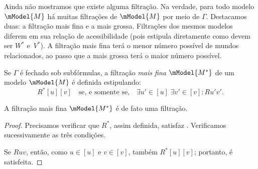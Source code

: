 \documentclass[../../../include/open-logic-section]{subfiles}
\begin{document}


Ainda não mostramos que existe alguma filtração. Na verdade, para todo
modelo $\mModel{M}$ há muitas filtrações de $\mModel{M}$ por meio de
$\Gamma$. Destacamos duas: a filtração mais fina e a mais grossa.
Filtrações dos mesmos modelos diferem em sua relação de acessibilidade
(pois  estipula diretamente como devem ser
$W^*$ e~$V^*$). A filtração mais fina terá o menor número possível de
mundos relacionados, ao passo que a mais grossa terá o maior número
possível.

\begin{defn}
  Se $\Gamma$ é fechado sob subfórmulas, a filtração \emph{mais fina}
  $\mModel{M^*}$ de um modelo $\mModel{M}$ é definida estipulando:
  \[
  R^*[u][v] \quad \text{se, e somente se,} \quad \exists u'\in [u] \;
  \exists v' \in [v] : Ru'v'.
  \]
\end{defn}

\begin{prop}
  A filtração mais fina $\mModel{M^*}$ é de fato uma filtração. 
\end{prop}

\begin{proof}
  Precisamos verificar que $R^*$, assim definida, satisfaz
  .
  Verificamos sucessivamente as três condições.

  Se $Ruv$, então, como $u \in [u]$ e $v \in [v]$, também $R^*[u][v]$;
  portanto,  é satisfeita.
  
  
\end{proof}
\end{document}
